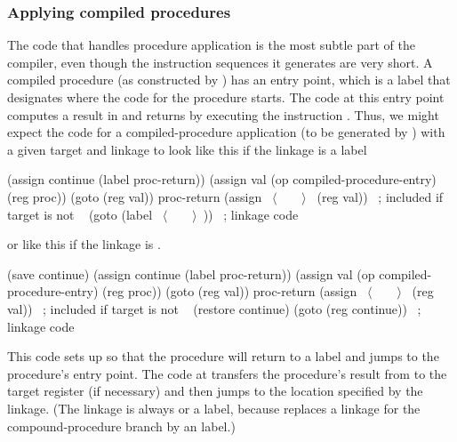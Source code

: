 \subsubsection*{Applying compiled procedures}

The code that handles procedure application is the most subtle part of the
compiler, even though the instruction sequences it generates are very short.  A
compiled procedure (as constructed by ) has an entry
point, which is a label that designates where the code for the procedure
starts.  The code at this entry point computes a result in  and
returns by executing the instruction .  Thus, we
might expect the code for a compiled-procedure application (to be generated by
) with a given target and linkage to look like this if
the linkage is a label

\begin{codeBlock}
(assign continue (label proc-return))
 (assign val (op compiled-procedure-entry) (reg proc))
 (goto (reg val))
proc-return
 (assign ~\(\langle \)~~~~\(\rangle \)~ (reg val))   ~\textrm{; included if target is not }~
 (goto (label ~\(\langle \)~~~~\(\rangle \)~))      ~\textrm{; linkage code}~
\end{codeBlock}

\noindent
or like this if the linkage is .

\begin{codeBlock}
(save continue)
 (assign continue (label proc-return))
 (assign val (op compiled-procedure-entry) (reg proc))
 (goto (reg val))
proc-return
 (assign ~\(\langle \)~~~~\(\rangle \)~ (reg val))   ~\textrm{; included if target is not }~
 (restore continue)
 (goto (reg continue))         ~\textrm{; linkage code}~
\end{codeBlock}

\noindent
This code sets up  so that the procedure will return to a label
 and jumps to the procedure's entry point.  The code at
 transfers the procedure's result from  to the
target register (if necessary) and then jumps to the location specified by the
linkage.  (The linkage is always  or a label, because
 replaces a  linkage for the
compound-procedure branch by an  label.)

